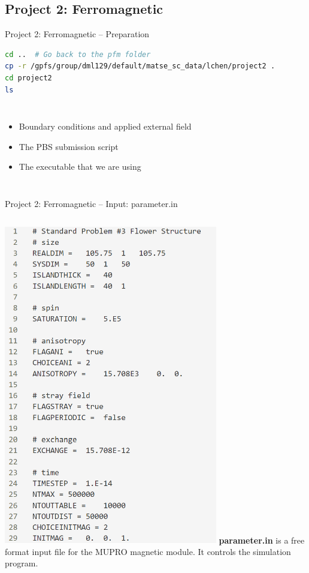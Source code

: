\documentclass[11pt,aspectratio=169]{beamer}
\begin{document}
\subsection[Project 2: Ferromagnetic]{Project 2: Ferromagnetic}
\begin{frame}[fragile]{Project 2: Ferromagnetic -- Preparation}
\small{
\begin{lstlisting}[language=bash]
cd ..  # Go back to the pfm folder
cp -r /gpfs/group/dml129/default/matse_sc_data/lchen/project2 .
cd project2
ls
\end{lstlisting}
}
\begin{columns}
    \begin{itemize}
        \item [parameter.in] Boundary conditions and applied external field 
        \item [magn.pbs] The PBS submission script
        \item [Magnetic.exe] The executable that we are using
    \end{itemize}
\end{columns}
\end{frame}

\begin{frame}[fragile]{Project 2: Ferromagnetic -- Input: parameter.in}
\begin{columns}
\centering
\vskip 0.5cm
\includegraphics[width=0.7\textwidth]{img/magn_param.png}
\justify
{\bf parameter.in} is a free format input file for the MUPRO magnetic module. It controls the simulation program.
\end{columns}
\end{frame}
\end{document}
